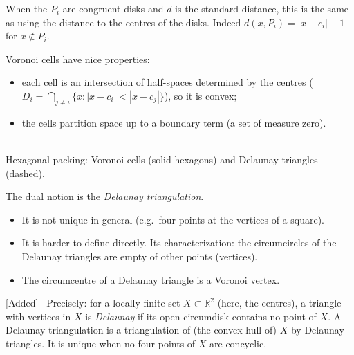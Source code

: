 \documentclass[11pt,openany]{book}
\theoremstyle{plain}
\theoremstyle{definition}
\theoremstyle{remark}
\newcommand{\added}[1]{{\color{addcol}#1}}
\newenvironment{addedblock}{\par\color{addcol}\noindent\textsf{\small[Added]}\ }{\par}
\newcommand{\R}{\mathbb{R}}
\begin{document}
When the $P_i$ are congruent disks and $d$ is the standard distance, this is the same as using
the distance to the centres of the disks. \added{Indeed $d(x,P_i)=|x-c_i|-1$ for $x\notin P_i$.}

Voronoi cells have nice properties:
\begin{itemize}[nosep]
  \item each cell is an intersection of half-spaces determined by the centres
        \added{($D_i=\bigcap_{j\ne i}\{x:|x-c_i|<|x-c_j|\}$)}, so it is convex;
  \item the cells partition space up to a boundary term \added{(a set of measure zero)}.
\end{itemize}

\begin{center}
\\[2pt]
{\small \added{Hexagonal packing: Voronoi cells (solid hexagons) and Delaunay triangles (dashed).}}
\end{center}

The dual notion is the \emph{Delaunay triangulation}.
\begin{itemize}[nosep]
  \item It is not unique in general (e.g.\ four points at the vertices of a square).
  \item It is harder to define directly. Its characterization: the circumcircles of the
        Delaunay triangles are empty of other points (vertices).
  \item The circumcentre of a Delaunay triangle is a Voronoi vertex.
\end{itemize}
\begin{addedblock}
Precisely: for a locally finite set $X\subset\R^2$ (here, the centres), a triangle with vertices
in $X$ is \emph{Delaunay} if its open circumdisk contains no point of $X$. A Delaunay triangulation is
a triangulation of (the convex hull of) $X$ by Delaunay triangles. It is unique when no four
points of $X$ are concyclic.
\end{addedblock}
\end{document}
